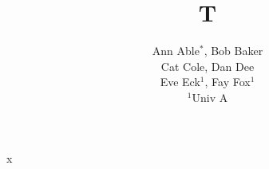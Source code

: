 \documentclass{article}
\title{T}
\author{Ann Able$^{*}$, Bob Baker \\ Cat Cole, Dan Dee \\ Eve Eck$^{1}$, Fay Fox$^{1}$\\ $^{1}$Univ A}
\begin{document}
\maketitle
x
\end{document}
